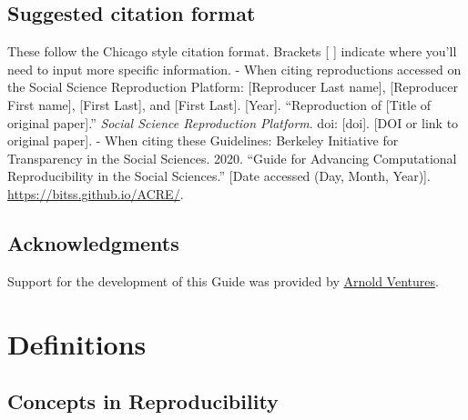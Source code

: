 \documentclass[
]{book}
\begin{document}
\hypertarget{suggested-citation-format}{%
\section{Suggested citation format}\label{suggested-citation-format}}

These follow the Chicago style citation format. Brackets {[} {]} indicate where you'll need to input more specific information.
- When citing reproductions accessed on the Social Science Reproduction Platform: {[}Reproducer Last name{]}, {[}Reproducer First name{]}, {[}First Last{]}, and {[}First Last{]}. {[}Year{]}. ``Reproduction of {[}Title of original paper{]}.'' \emph{Social Science Reproduction Platform}. doi: {[}doi{]}. {[}DOI or link to original paper{]}.
- When citing these Guidelines: Berkeley Initiative for Transparency in the Social Sciences. 2020. ``Guide for Advancing Computational Reproducibility in the Social Sciences.'' {[}Date accessed (Day, Month, Year){]}. \url{https://bitss.github.io/ACRE/}.

\hypertarget{acknowledgments}{%
\section{Acknowledgments}\label{acknowledgments}}

Support for the development of this Guide was provided by \href{https://www.arnoldventures.org/}{Arnold Ventures}.

\hypertarget{definitions}{%
\chapter{Definitions}\label{definitions}}

\hypertarget{concepts-in-reproducibility}{%
\section{Concepts in Reproducibility}\label{concepts-in-reproducibility}}
\end{document}
